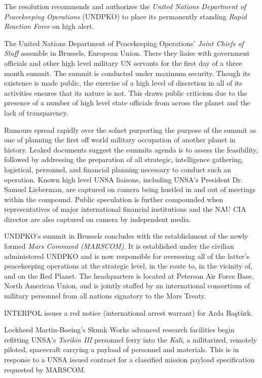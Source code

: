 The resolution recommends and authorizes the {\it United Nations Department of Peacekeeping Operations} (UNDPKO) to place its permanently standing {\it Rapid Reaction Force} on high alert.
\StopTimelineDate

The United Nations Department of Peacekeeping Operations' {\it Joint Chiefs of Staff} assemble in Brussels, European Union. There they liaise with government officials and other high level military UN servants for the first day of a three month summit. The summit is conducted under maximum security. Though its existence is made public, the exercise of a high level of discretion in all of its activities ensures that its nature is not. This draws public criticism due to the presence of a number of high level state officials from across the planet and the lack of transparency.

Rumours spread rapidly over the solnet purporting the purpose of the summit as one of planning the first off world military occupation of another planet in history. Leaked documents suggest the summits agenda is to assess the feasibility, followed by addressing the preparation of all strategic, intelligence gathering, logistical, personnel, and financial planning necessary to conduct such an operation. Known high level UNSA liaisons, including UNSA's President Dr. Samuel Lieberman, are captured on camera being hustled in and out of meetings within the compound. Public speculation is further compounded when representatives of major international financial institutions and the NAU CIA director are also captured on camera by independent media.
\StopTimelineDate

UNDPKO's summit in Brussels concludes with the establishment of the newly formed {\it Mars Command (MARSCOM)}. It is established under the civilian administered UNDPKO and is now responsible for overseeing all of the latter's peacekeeping operations at the strategic level, in the route to, in the vicinity of, and on the Red Planet. The headquarters is located at Peterson Air Force Base, North American Union, and is jointly staffed by an international consortium of military personnel from all nations signatory to the Mars Treaty.
\StopTimelineDate

INTERPOL issues a red notice (international arrest warrant) for Arda Baştürk.
\StopTimelineDate

Lockheed Martin-Boeing's Skunk Works advanced research facilities begin refitting UNSA's {\it Tarikin III} personnel ferry into the {\it Kali}, a militarized, remotely piloted, spacecraft carrying a payload of personnel and materials. This is in response to a UNSA issued contract for a classified mission payload specification requested by MARSCOM.
\StopTimelineDate

